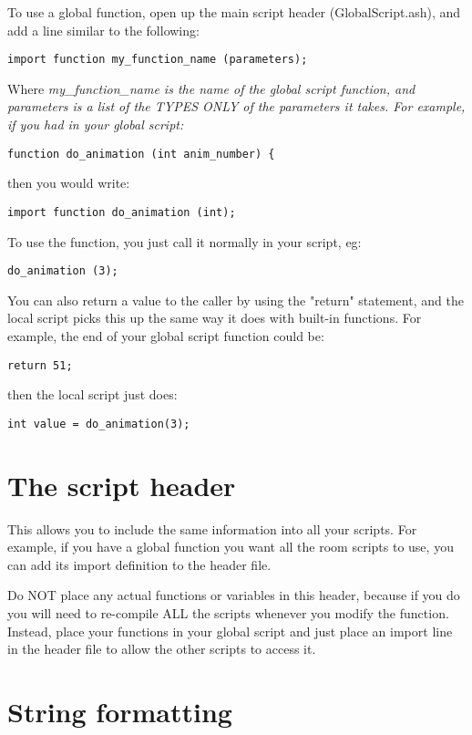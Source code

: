 To use a global function, open up the main script header (GlobalScript.ash),
and add a line similar to the following:
\begin{verbatim}
import function my_function_name (parameters);
\end{verbatim}
Where \it{my_function_name} is the name of the global script function, and
\it{parameters} is a list of the TYPES ONLY of the parameters it takes. For example,
if you had in your global script:
\begin{verbatim}
function do_animation (int anim_number) {
\end{verbatim}
then you would write:
\begin{verbatim}
import function do_animation (int);
\end{verbatim}
To use the function, you just call it normally in your script, eg:
\begin{verbatim}
do_animation (3);
\end{verbatim}
You can also return a value to the caller by using the "return" statement,
and the local script picks this up the same way it does with built-in
functions. For example, the end of your global script function could be:
\begin{verbatim}
return 51;
\end{verbatim}
then the local script just does:
\begin{verbatim}
int value = do_animation(3);
\end{verbatim}

\section{The script header}%

This allows you to include the same information into all your scripts. For
example, if you have a global function you want all the room scripts to use,
you can add its import definition to the header file.

Do NOT place any actual functions or variables in this header, because if
you do you will need to re-compile ALL the scripts whenever you modify the
function. Instead, place your functions in your global script and just place
an import line in the header file to allow the other scripts to access it.


\section{String formatting}\label{StringFormats}%

